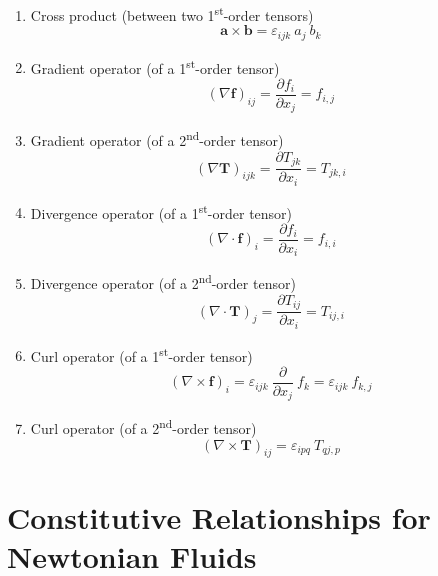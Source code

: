 \documentclass[a4paper]{article}
\begin{document}
\begin{multicols}{2}
\begin{enumerate}
    \item Cross product (between two 1\textsuperscript{st}-order tensors) 
    \[\mathbf{a} \times \mathbf{b} = \varepsilon_{ijk} \ a_{j} \ b_{k}\]
    
    \item Gradient operator (of a 1\textsuperscript{st}-order tensor)
    \[ (\nabla \mathbf{f})_{ij} = \frac{\partial f_{i}}{\partial x_{j}} = f_{i,j}\]

    \item Gradient operator (of a 2\textsuperscript{nd}-order tensor)
    \[ (\nabla \mathbf{T})_{ijk} = \frac{\partial T_{jk}}{\partial x_{i}} = T_{jk, i}\]
    
    \item Divergence operator (of a 1\textsuperscript{st}-order tensor)
    \[(\nabla \cdot \mathbf{f})_{i} = \frac{\partial f_{i}}{\partial x_{i}} = f_{i,i}\]
    
    \item Divergence operator (of a 2\textsuperscript{nd}-order tensor)
    \[(\nabla \cdot \mathbf{T})_{j} = \frac{\partial T_{ij}}{\partial x_{i}} = T_{ij, i}\]
    
    \item Curl operator (of a 1\textsuperscript{st}-order tensor)
    \[(\nabla \times \mathbf{f})_i = \varepsilon_{ijk} \ \frac{\partial}{\partial x_{j}} \ f_{k} = \varepsilon_{ijk} \ f_{k,j}\]

    \item Curl operator (of a 2\textsuperscript{nd}-order tensor)
    \[(\nabla \times \mathbf{T})_{ij} = \varepsilon_{ipq} \ T_{qj,p}\]
\end{enumerate}
\end{multicols}


\section{Constitutive Relationships for Newtonian Fluids}
\end{document}
